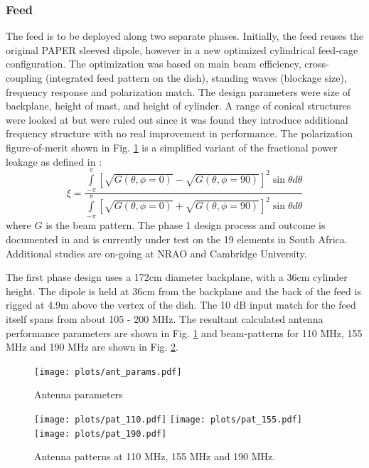\documentclass[preprint,11pt]{aastex}
\newcommand{\integral}{\int\limits}
\begin{document}
\subsubsection{Feed}
\label{sec:feed}
The feed is to be deployed along two separate phases.  Initially, the feed reuses the original PAPER sleeved dipole, however in a new optimized cylindrical feed-cage configuration.  The optimization was based on main beam efficiency, cross-coupling (integrated feed pattern on the dish), standing waves (blockage size), frequency response and polarization match.  The design parameters were size of backplane, height of mast, and height of cylinder.  A range of conical structures were looked at but were ruled out since it was found they introduce additional frequency structure with no real improvement in performance.  The polarization figure-of-merit shown in Fig. \ref{fig:ant_params} is a simplified variant of the fractional power leakage as defined in \cite{Moore_et_al2015}:
\begin{equation}
\xi = \frac{\integral_{-\pi}^{\pi}\left[\sqrt{G(\theta,\phi=0)} - \sqrt{G(\theta,\phi=90)}\right]^2\sin\theta d\theta}
               {\integral_{-\pi}^{\pi}\left[\sqrt{G(\theta,\phi=0)} + \sqrt{G(\theta,\phi=90)}\right]^2\sin\theta d\theta}
\end{equation}
where $G$ is the beam pattern.
The phase 1 design process and outcome is documented in  \cite{feedmemo} and is currently under test on the 19 elements in South Africa. Additional studies are on-going at NRAO and Cambridge University.

The first phase design uses a 172cm diameter backplane, with a 36cm cylinder height.  The dipole is held at 36cm from the backplane and the back of the feed is rigged at 4.9m above the vertex of the dish.  The 10 dB input match for the feed itself spans from about 105 - 200 MHz.  The resultant calculated antenna performance parameters are shown in Fig. \ref{fig:ant_params} and beam-patterns for 110 MHz, 155 MHz and 190 MHz are shown in Fig. \ref{fig:beampatterns}.

\begin{figure}[h!]
\centerline{
\texttt{[image: plots/ant\_params.pdf]}
}
\caption{\small Antenna parameters}
\label{fig:ant_params}
\end{figure}

\begin{figure}[h!]
\centerline{
\texttt{[image: plots/pat\_110.pdf]}
\texttt{[image: plots/pat\_155.pdf]}
\texttt{[image: plots/pat\_190.pdf]}
}
\caption{\small Antenna patterns at 110 MHz, 155 MHz and 190 MHz.}
\label{fig:beampatterns}
\end{figure}
\end{document}

